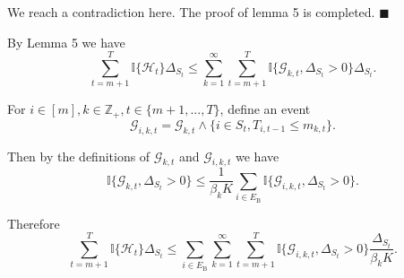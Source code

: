 \documentclass[opre,sglanonrev]{informs4}
\begin{document}
We reach a contradiction here. The proof of lemma 5 is completed.
\hfill $\blacksquare$

By Lemma 5 we have
$$\sum_{t=m+1}^T\mathbb{I} \{\mathcal{H}_t\}\Delta_{S_t}\leq\sum_{k=1}^\infty\sum_{t=m+1}^T\mathbb{I}\{\mathcal{G}_{k,t},\Delta_{S_t}>0\}\Delta_{S_t}.$$

For $i\in [m], k\in \mathbb{Z}_+, t\in \{m+1,...,T\}$, define an event
$$\mathcal{G}_{i,k,t}=\mathcal{G}_{k,t}\wedge\{i\in S_t,T_{i,t-1}\leq m_{k,t}\}.$$

Then by the definitions of $\mathcal{G}_{k,t}$ and $\mathcal{G}_{i,k,t}$ we have
$$\mathbb{I}\{\mathcal{G}_{k,t},\Delta_{S_t}>0\}\leq\frac{1}{\beta_kK}\sum_{i\in E_\mathrm{B}}\mathbb{I}\{\mathcal{G}_{i,k,t},\Delta_{S_t}>0\}.$$

Therefore
$$\sum_{t=m+1}^T\mathbb{I}\{\mathcal{H}_t\}\Delta_{S_t}\leq\sum_{i\in E_\mathrm{B}}\sum_{k=1}^\infty\sum_{t=m+1}^T\mathbb{I}\{\mathcal{G}_{i,k,t},\Delta_{S_t}>0\}\frac{\Delta_{S_t}}{\beta_kK}.$$
\end{document}
